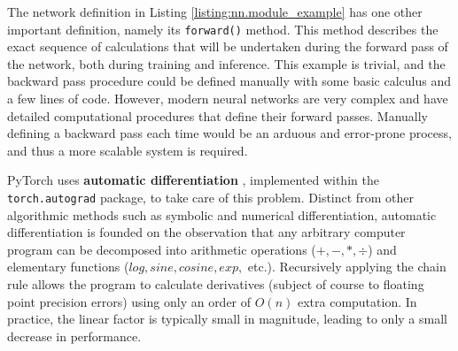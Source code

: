 \documentclass[12pt,letterpaper]{article}
\begin{document}
%
%

\label{dynamic_computational_graphs_and_autograd}
The network definition in Listing \ref{listing:nn.module_example} has one other important definition, namely its \texttt{forward()} method. This method describes the exact sequence of calculations that will be undertaken during the forward pass of the network, both during training and inference. This example is trivial, and the backward pass procedure could be defined manually with some basic calculus and a few lines of code. However, modern neural networks are very complex and have detailed computational procedures that define their forward passes. Manually defining a backward pass each time would be an arduous and error-prone process, and thus a more scalable system is required.
\par

PyTorch uses \textbf{automatic differentiation} \cite{automatic_differentiation}, implemented within the \texttt{torch.autograd} package, to take care of this problem. Distinct from other algorithmic methods such as symbolic and numerical differentiation, automatic differentiation is founded on the observation that any arbitrary computer program can be decomposed into arithmetic operations ($+,-,*,\div$) and elementary functions ($log, sine, cosine, exp,$ etc.). Recursively applying the chain rule allows the program to calculate derivatives (subject of course to floating point precision errors) using only an order of $O(n)$ extra computation. In practice, the linear factor is typically small in magnitude, leading to only a small decrease in performance.
\par 
\end{document}
